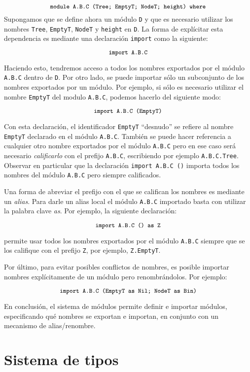 \[ {\small \texttt{module A.B.C (Tree; EmptyT; NodeT; height) where}} \]
Supongamos que se define ahora un módulo \verb|D| y que es necesario utilizar
los nombres \verb|Tree|, \verb|EmptyT|, \verb|NodeT| y \verb|height| en \verb|D|.
La forma de explícitar esta dependencia es mediante una declaración \texttt{import}
como la siguiente:

\[ {\small \texttt{import A.B.C}} \]

\noindent Haciendo esto, tendremos acceso a todos los nombres exportados por el módulo
\verb|A.B.C| dentro de \verb|D|.
Por otro lado, se puede importar sólo un subconjunto de los nombres exportados
por un módulo. Por ejemplo, si sólo es necesario utilizar el nombre \verb|EmptyT|
del modulo \verb|A.B.C|, podemos hacerlo del siguiente modo:

\[ {\small \texttt{import A.B.C (EmptyT)}} \]

\noindent Con esta declaración, el identificador \verb|EmptyT| ``desnudo''
se refiere al nombre \verb|EmptyT| declarado en el módulo \verb|A.B.C|.
También se puede hacer referencia a cualquier otro
nombre exportados por el módulo \verb|A.B.C|
pero en ese caso será necesario {\em calificarlo}
con el prefijo \verb|A.B.C|, escribiendo por ejemplo
\verb|A.B.C.Tree|.
Observar en particular que la declaración \verb|import A.B.C ()|
importa todos los nombres del módulo \verb|A.B.C| pero siempre calificados.

Una forma de abreviar el prefijo con el que se califican los nombres es
mediante un {\em alias}.
Para darle un alias local el módulo \verb|A.B.C| importado
basta con utilizar la palabra clave {\em as}. Por ejemplo, la
siguiente declaración:

\[ {\small \texttt{import A.B.C () as Z}} \]

permite usar todos los nombres exportados por el módulo \verb|A.B.C|
siempre que se los califique con el prefijo \verb|Z|, por ejemplo, \verb|Z.EmptyT|.

Por último, para evitar posibles conflictos de nombres,
es posible importar nombres explícitamente de un módulo pero renombrándolos.
Por ejemplo:

\[ {\small \texttt{import A.B.C (EmptyT as Nil; NodeT as Bin)}} \]

En conclusión, el sistema de módulos permite definir e importar módulos,
especificando qué nombres se exportan e importan,
en conjunto con un mecanismo de alias/renombre.

\section{Sistema de tipos}


